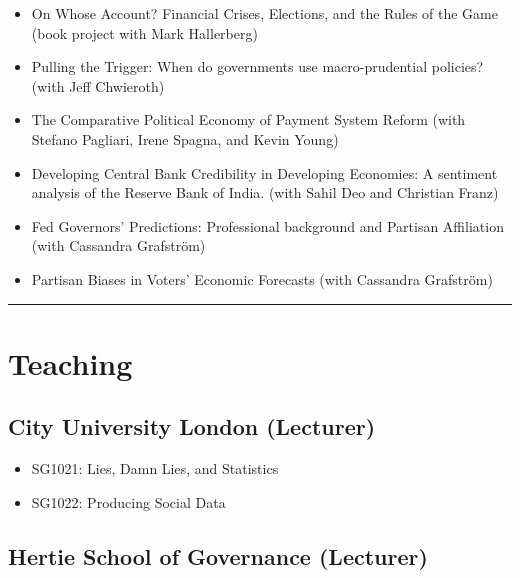 \documentclass[a4paper]{article}
\begin{document}
{\begin{itemize}
    \item On Whose Account? Financial Crises, Elections, and the Rules of the Game (book project with Mark Hallerberg)

    \item Pulling the Trigger: When do governments use macro-prudential policies? (with Jeff Chwieroth)

    \item The Comparative Political Economy of Payment System Reform (with Stefano Pagliari, Irene Spagna, and Kevin Young)

    \item Developing Central Bank Credibility in Developing Economies: A sentiment
    analysis of the Reserve Bank of India. (with Sahil Deo and Christian Franz)

    \item Fed Governors' Predictions: Professional background and Partisan Affiliation (with Cassandra Grafstr\"{o}m)

    \item Partisan Biases in Voters' Economic Forecasts (with Cassandra Grafstr\"{o}m)

\end{itemize}


\vspace{0.25cm}
\medskip\hrule height 1pt
\vspace{0.5cm}

\section*{Teaching}

\subsection*{City University London (Lecturer)}

\begin{itemize}
    \item SG1021: Lies, Damn Lies, and Statistics

    \item SG1022: Producing Social Data
\end{itemize}

\subsection*{Hertie School of Governance (Lecturer)}

}
\end{document}
